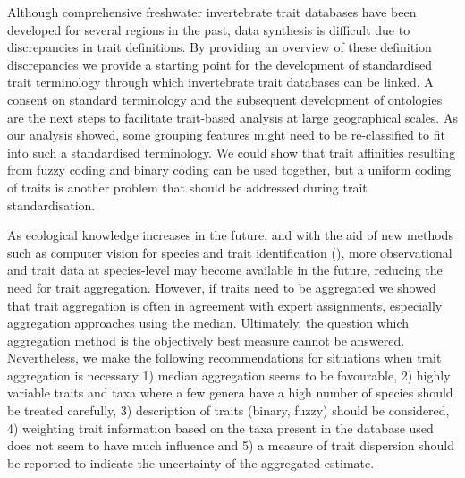 \documentclass{article}
\begin{document}
Although comprehensive freshwater invertebrate trait databases have been developed for several regions in the past, data synthesis is difficult due to discrepancies in trait definitions. By providing an overview of these definition discrepancies we provide a starting point for the development of standardised trait terminology through which invertebrate trait databases can be linked. A consent on standard terminology and the subsequent development of ontologies are the next steps to facilitate trait-based analysis at large geographical scales. As our analysis showed, some grouping features might need to be re-classified to fit into such a standardised terminology. We could show that trait affinities resulting from fuzzy coding and binary coding can be used together, but a uniform coding of traits is another problem that should be addressed during trait standardisation. 

As ecological knowledge increases in the future, and with the aid of new  methods such as computer vision for species and trait identification (\cite{hoye_deep_2020}), more observational and trait data at species-level may become available in the future, reducing the need for trait aggregation. However, if traits need to be aggregated we showed that trait aggregation is often in agreement with expert assignments, especially aggregation approaches using the median. Ultimately, the question which aggregation method is the objectively best measure cannot be answered. Nevertheless, we make the following recommendations for situations when trait aggregation is necessary 1) median aggregation seems to be favourable, 2) highly variable traits and taxa where a few genera have a high number of species should be treated carefully, 3) description of traits (binary, fuzzy) should be considered, 4) weighting trait information based on the taxa present in the database used does not seem to have much influence and 5) a measure of trait dispersion should be reported to indicate the uncertainty of the aggregated estimate. 
\end{document}
